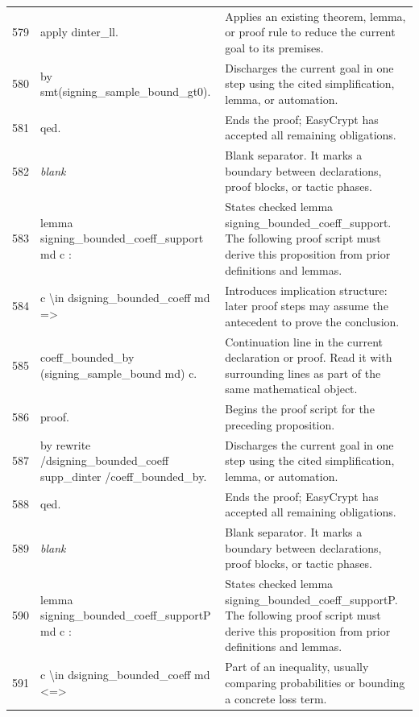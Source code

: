 \documentclass[10pt]{article}
\begin{document}
\begin{longtable}{r L{0.53\textwidth} L{0.37\textwidth}}
579 & {\ttfamily\scriptsize apply dinter\_ll.} & Applies an existing theorem, lemma, or proof rule to reduce the current goal to its premises. \\
580 & {\ttfamily\scriptsize by smt(signing\_sample\_bound\_gt0).} & Discharges the current goal in one step using the cited simplification, lemma, or automation. \\
581 & {\ttfamily\scriptsize qed.} & Ends the proof; EasyCrypt has accepted all remaining obligations. \\
582 & {\ttfamily\scriptsize \emph{blank}} & Blank separator.  It marks a boundary between declarations, proof blocks, or tactic phases. \\
583 & {\ttfamily\scriptsize lemma signing\_bounded\_coeff\_support md c :} & States checked lemma signing\_bounded\_coeff\_support.  The following proof script must derive this proposition from prior definitions and lemmas. \\
584 & {\ttfamily\scriptsize   c \textbackslash{}in dsigning\_bounded\_coeff md =>} & Introduces implication structure: later proof steps may assume the antecedent to prove the conclusion. \\
585 & {\ttfamily\scriptsize   coeff\_bounded\_by (signing\_sample\_bound md) c.} & Continuation line in the current declaration or proof.  Read it with surrounding lines as part of the same mathematical object. \\
586 & {\ttfamily\scriptsize proof.} & Begins the proof script for the preceding proposition. \\
587 & {\ttfamily\scriptsize by rewrite /dsigning\_bounded\_coeff supp\_dinter /coeff\_bounded\_by.} & Discharges the current goal in one step using the cited simplification, lemma, or automation. \\
588 & {\ttfamily\scriptsize qed.} & Ends the proof; EasyCrypt has accepted all remaining obligations. \\
589 & {\ttfamily\scriptsize \emph{blank}} & Blank separator.  It marks a boundary between declarations, proof blocks, or tactic phases. \\
590 & {\ttfamily\scriptsize lemma signing\_bounded\_coeff\_supportP md c :} & States checked lemma signing\_bounded\_coeff\_supportP.  The following proof script must derive this proposition from prior definitions and lemmas. \\
591 & {\ttfamily\scriptsize   c \textbackslash{}in dsigning\_bounded\_coeff md <=>} & Part of an inequality, usually comparing probabilities or bounding a concrete loss term. \\

\end{longtable}
\end{document}
